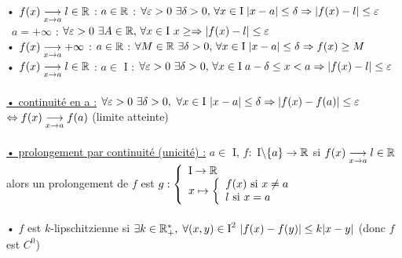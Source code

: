 \documentclass[12 pt]{exampleclass}
\begin{document}
\begin{flushleft}
\begin{doublespace}

	• $f(x) \underset{x \rightarrow a}{\longrightarrow} l\in\mathbb{R}$ : $a\in\mathbb{R}$ : $\forall \varepsilon > 0 \ \exists \delta > 0, \, \forall x\in \text{I} \; |x - a|\leq \delta \Rightarrow |f(x) - l| \leq \varepsilon$\\
	\qquad \qquad \qquad \qquad \ $a = + \infty$ : $\forall \varepsilon > 0 \ \exists A\in \mathbb{R}, \, \forall x\in \text{I} \ x\geq \Rightarrow |f(x) - l|\leq \varepsilon$\\
	• $f(x) \underset{x \rightarrow a}{\longrightarrow} +\infty$ : $a\in\mathbb{R}$ : $\forall M\in\mathbb{R} \ \exists \delta > 0, \, \forall x\in \text{I} \; |x - a|\leq \delta \Rightarrow f(x)\geq M$\\
	• $f(x) \underset{x \rightarrow a}{\longrightarrow} l\in\mathbb{R}$ : $a\in$ I : $\forall \varepsilon > 0 \ \exists \delta > 0, \, \forall x\in \text{I} \; a-\delta \leq x < a \Rightarrow |f(x) - l| \leq \varepsilon$\\
	
	\text{ }\\
	\underline{• continuité en a :} $\forall \varepsilon >0 \ \exists \delta > 0, \ \forall x\in \text{I} \ |x - a|\leq \delta \Rightarrow |f(x) - f(a)| \leq \varepsilon$\\
	\qquad \qquad \qquad \qquad $\Leftrightarrow f(x) \underset{x \rightarrow a}{\longrightarrow} f(a)$ (limite atteinte)\\
	
	\text{ }\\
	\underline{• prolongement par continuité (unicité) :} $a\in$ I, $f :$ I$\backslash\{a\} \rightarrow \mathbb{R}$ si $f(x) \underset{x \rightarrow a}{\longrightarrow} l\in \mathbb{R}$\\
	alors un prolongement de $f$ est $g : \left\{\begin{array}{ll} \text{I} \ra \R \\ x \mapsto \left\{\begin{array}{ll} f(x) \ \text{si } x\ne a \\ l \ \text{si } x=a \end{array} \right.  \end{array} \right.$\\
	
	\text{ }\\
	• $f$ est $k$-lipschitzienne si $\exists k\in \mathbb{R}_+^*, \; \forall (x,y)\in \text{I}^2 \ |f(x) - f(y)| \leq k|x - y|$  (donc $f$ est $C^0$)\\
	
\end{doublespace}
\end{flushleft}
\end{document}
